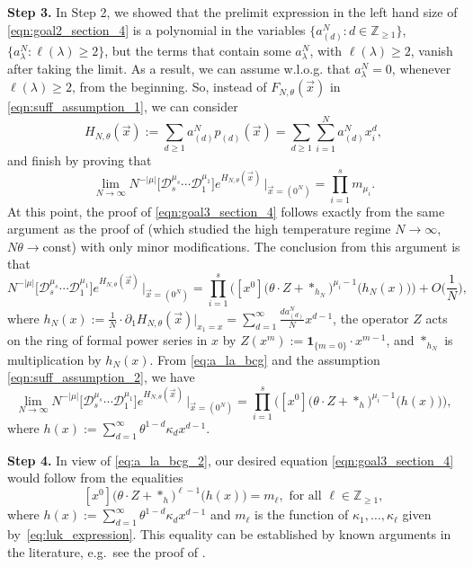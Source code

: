 \documentclass[11pt]{article}
\theoremstyle{plain}
\newcommand{\D}{\mathcal D}
\newcommand{\Z}{\mathbb Z}
\newcommand{\la}{\lambda}
\newcommand{\vecx}{\vec{x}}
\begin{document}
\textbf{Step 3.} In Step 2, we showed that the prelimit expression in the left hand size of \eqref{eqn:goal2_section_4} is a polynomial in the variables $\{a_{(d)}^N : d\in\Z_{\ge 1}\}$, $\{a_\la^N : \ell(\la)\ge 2\}$, but the terms that contain some $a_\la^N$, with $\ell(\la)\ge 2$, vanish after taking the limit.
As a result, we can assume w.l.o.g. that $a_\la^N=0$, whenever $\ell(\la)\ge 2$, from the beginning. So, instead of $F_{N,\theta}(\vecx)$ in \eqref{eqn:suff_assumption_1}, we can consider
\[
H_{N,\theta}(\vecx):= \sum_{d\ge 1}{a_{(d)}^N p_{(d)}(\vecx)} = \sum_{d\ge 1}\sum_{i=1}^N{a_{(d)}^N x_i^d},
\]
and finish by proving that
\begin{equation}\label{eqn:goal3_section_4}
\lim_{N\to\infty}{ N^{-|\mu|}\Big[ \D_s^{\mu_s}\cdots\D_1^{\mu_1} \Big] e^{ H_{N,\theta}(\vecx) } \,\Big|_{\vecx=(0^N)} } = \prod_{i=1}^s{ m_{\mu_i} }.
\end{equation}
At this point, the proof of \eqref{eqn:goal3_section_4} follows exactly from the same argument as the proof of \cite[Proposition~5.6]{BCG} (which studied the high temperature regime $N\to\infty$, $N\theta\to\text{const}$) with only minor modifications.
The conclusion from this argument is that
\begin{equation}\label{eq:a_la_bcg}
N^{-|\mu|}\Big[ \D_s^{\mu_s}\cdots\D_1^{\mu_1} \Big] e^{ H_{N,\theta}(\vecx) } \,\Big|_{\vecx=(0^N)} = \prod_{i=1}^s{ \Big( [x^0]\big(\theta\cdot Z + *_{h_N}\big)^{\mu_i-1}\big(h_N(x)\big) \Big) } + O\bigg( \frac{1}{N} \bigg),
\end{equation}
where $\displaystyle h_N(x):=\frac{1}{N}\cdot\partial_1 H_{N,\theta}(\vecx)|_{x_1=x}=\sum_{d=1}^\infty{\frac{d a^N_{(d)}}{N}x^{d-1}}$, the operator $Z$ acts on the ring of formal power series in $x$ by $Z(x^m) := \mathbf{1}_{\{m=0\}}\cdot x^{m-1}$, and $*_{h_N}$ is multiplication by $h_N(x)$.
From \eqref{eq:a_la_bcg} and the assumption \eqref{eqn:suff_assumption_2}, we have
\begin{equation}\label{eq:a_la_bcg_2}
\lim_{N\to\infty}{ N^{-|\mu|}\Big[ \D_s^{\mu_s}\cdots\D_1^{\mu_1} \Big] e^{ H_{N,\theta}(\vecx) } \,\Big|_{\vecx=(0^N)} } = \prod_{i=1}^s{ \Big( [x^0]\big(\theta\cdot Z + *_h\big)^{\mu_i-1}\big(h(x)\big) \Big) },
\end{equation}
where $h(x):=\sum_{d=1}^\infty{\theta^{1-d}\kappa_d x^{d-1}}$.

\smallskip

\textbf{Step 4.} In view of \eqref{eq:a_la_bcg_2}, our desired equation \eqref{eqn:goal3_section_4} would follow from the equalities
\begin{equation}\label{eq:limit_fixed_temp}
[x^0]\big(\theta\cdot Z + *_h\big)^{\ell-1}\big(h(x)\big) = m_\ell,\text{ for all }\ell\in\Z_{\ge 1},
\end{equation}
where $h(x):=\sum_{d=1}^\infty{\theta^{1-d}\kappa_d x^{d-1}}$ and $m_\ell$ is the function of $\kappa_1,\dots,\kappa_\ell$ given by~\eqref{eq:luk_expression}.
This equality can be established by known arguments in the literature, e.g.~see the proof of \cite[Theorem~3.6]{Cue0}.
\end{document}
